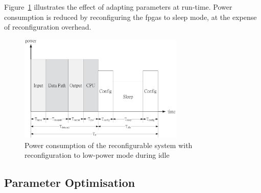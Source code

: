 Figure~\ref{fig:timing2b} illustrates the effect of adapting parameters at run-time.
Power consumption is reduced by reconfiguring the \glspl{fpga} to sleep mode, at the expense of reconfiguration overhead.

\begin{figure}[t!]
\begin{center}
\includegraphics[width=0.7\textwidth]{4_adaptation/figures/fig_timing2}
\end{center}
\caption{Power consumption of the reconfigurable system with reconfiguration to low-power mode during idle}
\label{fig:timing2b}
\end{figure}

\subsection{Parameter Optimisation}
\label{sec:flow_dse}

